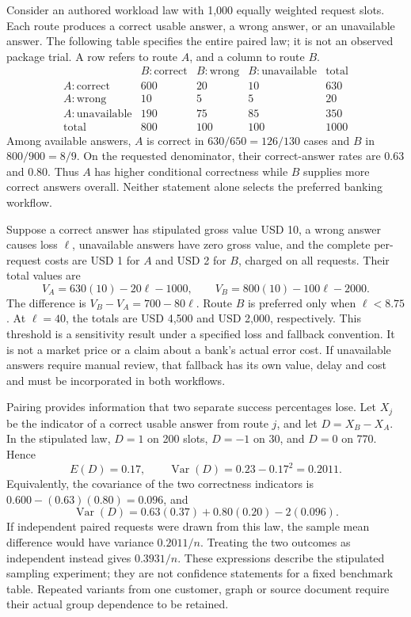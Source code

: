 Consider an authored workload law with 1,000 equally weighted request slots.
Each route produces a correct usable answer, a wrong answer, or an unavailable
answer. The following table specifies the entire paired law; it is not an
observed package trial. A row refers to route \(A\), and a column to route
\(B\).
\[
\begin{array}{c|rrr|r}
 &B:\mathrm{correct}&B:\mathrm{wrong}&B:\mathrm{unavailable}&\mathrm{total}\\\hline
 A:\mathrm{correct}&600&20&10&630\\
 A:\mathrm{wrong}&10&5&5&20\\
 A:\mathrm{unavailable}&190&75&85&350\\\hline
 \mathrm{total}&800&100&100&1000
\end{array}
\]
Among available answers, \(A\) is correct in \(630/650=126/130\) cases and
\(B\) in \(800/900=8/9\). On the requested denominator, their correct-answer
rates are 0.63 and 0.80. Thus \(A\) has higher conditional correctness while
\(B\) supplies more correct answers overall. Neither statement alone selects
the preferred banking workflow.
\citep{exec16_s10_exact}

Suppose a correct answer has stipulated gross value USD 10, a wrong answer
causes loss \(\ell\), unavailable answers have zero gross value, and the
complete per-request costs are USD 1 for \(A\) and USD 2 for \(B\), charged on
all requests. Their total values are
\[
 V_A=630(10)-20\ell-1000,\qquad
 V_B=800(10)-100\ell-2000.
\]
The difference is \(V_B-V_A=700-80\ell\). Route \(B\) is preferred only when
\(\ell<8.75\). At \(\ell=40\), the totals are USD 4,500 and USD 2,000,
respectively. This threshold is a sensitivity result under a specified loss
and fallback convention. It is not a market price or a claim about a bank's
actual error cost. If unavailable answers require manual review, that fallback
has its own value, delay and cost and must be incorporated in both workflows.
\citep{exec16_s10_exact}

Pairing provides information that two separate success percentages lose. Let
\(X_j\) be the indicator of a correct usable answer from route \(j\), and let
\(D=X_B-X_A\). In the stipulated law, \(D=1\) on 200 slots, \(D=-1\) on 30,
and \(D=0\) on 770. Hence
\[
 E(D)=0.17,\qquad
 \operatorname{Var}(D)=0.23-0.17^2=0.2011.
\]
Equivalently, the covariance of the two correctness indicators is
\(0.600-(0.63)(0.80)=0.096\), and
\[
 \operatorname{Var}(D)=0.63(0.37)+0.80(0.20)-2(0.096).
\]
If independent paired requests were drawn from this law, the sample mean
difference would have variance \(0.2011/n\). Treating the two outcomes as
independent instead gives \(0.3931/n\). These expressions describe the
stipulated sampling experiment; they are not confidence statements for a
fixed benchmark table. Repeated variants from one customer, graph or source
document require their actual group dependence to be retained.
\citep{exec16_s10_exact}

